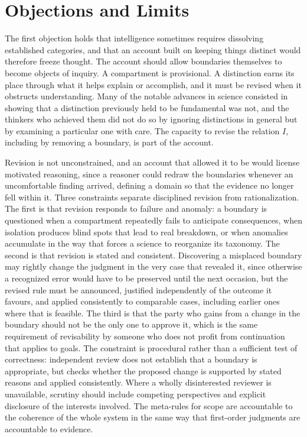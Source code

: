 \documentclass[12pt, a4paper]{article}
\begin{document}
\section{Objections and Limits}

The first objection holds that intelligence sometimes requires dissolving established categories, and that an account built on keeping things distinct would therefore freeze thought. The account should allow boundaries themselves to become objects of inquiry. A compartment is provisional. A distinction earns its place through what it helps explain or accomplish, and it must be revised when it obstructs understanding. Many of the notable advances in science consisted in showing that a distinction previously held to be fundamental was not, and the thinkers who achieved them did not do so by ignoring distinctions in general but by examining a particular one with care. The capacity to revise the relation $I$, including by removing a boundary, is part of the account.

Revision is not unconstrained, and an account that allowed it to be would license motivated reasoning, since a reasoner could redraw the boundaries whenever an uncomfortable finding arrived, defining a domain so that the evidence no longer fell within it. Three constraints separate disciplined revision from rationalization. The first is that revision responds to failure and anomaly: a boundary is questioned when a compartment repeatedly fails to anticipate consequences, when isolation produces blind spots that lead to real breakdown, or when anomalies accumulate in the way that forces a science to reorganize its taxonomy. The second is that revision is stated and consistent. Discovering a misplaced boundary may rightly change the judgment in the very case that revealed it, since otherwise a recognized error would have to be preserved until the next occasion, but the revised rule must be announced, justified independently of the outcome it favours, and applied consistently to comparable cases, including earlier ones where that is feasible. The third is that the party who gains from a change in the boundary should not be the only one to approve it, which is the same requirement of revisability by someone who does not profit from continuation that applies to goals. The constraint is procedural rather than a sufficient test of correctness: independent review does not establish that a boundary is appropriate, but checks whether the proposed change is supported by stated reasons and applied consistently. Where a wholly disinterested reviewer is unavailable, scrutiny should include competing perspectives and explicit disclosure of the interests involved. The meta-rules for scope are accountable to the coherence of the whole system in the same way that first-order judgments are accountable to evidence.
\end{document}
